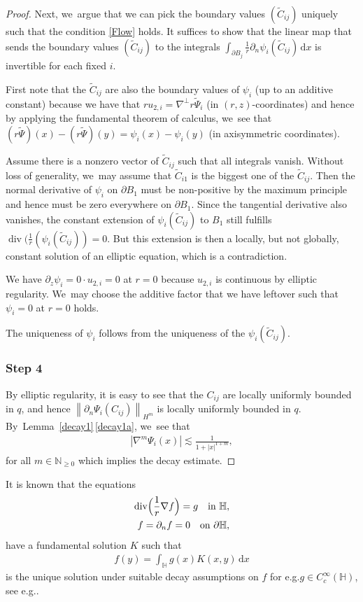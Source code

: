\documentclass[10pt]{amsart}
\newcommand{\eg}{e.g.}
\theoremstyle{definition}
\renewcommand{\div}{\operatorname{div}}
\newcommand\N{\mathbb{N}}
\newcommand\norm[1]{\left\lVert #1\right\rVert}
\newcommand\eq{=}
\newcommand\dd{\,\mathrm{d}}
\newcommand\dx{\dd x}
\let\de\partial
\begin{document}
\begin{proof}
Next, we~argue that we can pick the boundary values $(\tilde{C}_{ij})$ uniquely such that the condition \eqref{Flow} holds. It suffices to show that the linear map that sends the boundary values $(\tilde{C}_{ij})$ to the integrals $\int_{\de B_j}\frac{1}{r}\de_{n}\psi_i(\tilde{C}_{ij})\dx$ is invertible for each fixed $i$.

First note that the $\tilde{C}_{ij}$ are also the boundary values of $\psi_i$ (up to an additive constant) because we have that $ru_{2,i}=\nabla^\perp r\tilde{\Psi}_i$ (in $(r,z)$-coordinates) and hence by applying the fundamental theorem of calculus, we~see that $(r\tilde{\Psi})(x)-(r\tilde{\Psi})(y)=\psi_i(x)-\psi_i(y)$ (in axisymmetric coordinates).

Assume there is a nonzero vector of $\tilde{C}_{ij}$ such that all integrals vanish. Without loss of generality, we~may assume that $\tilde{C}_{i1}$ is the biggest one of the $\tilde{C}_{ij}$. Then the normal derivative of $\psi_i$ on $\de B_1$ must be non-positive by the maximum principle and hence must be zero everywhere on $\de B_1$. Since the tangential derivative also vanishes, the constant extension of $\psi_i(\tilde{C}_{ij})$ to $B_1$ still fulfills $\div(\frac{1}{r}(\psi_i(\tilde{C}_{ij}))=0$. But this extension is then a locally, but not globally, constant solution of an elliptic equation, which is a contradiction.

We have $\de_z\psi_i=0\cdot u_{2,i}=0$ at $r=0$ because $u_{2,i}$ is continuous by elliptic regularity. We~may choose the additive factor that we have leftover such that $\psi_i=0$ at $r=0$ holds.

The uniqueness of $\psi_i$ follows from the uniqueness of the $\psi_i(\tilde{C}_{ij})$.

\subsubsection*{Step 4} By elliptic regularity, it is easy to see that the $C_{ij}$ are locally uniformly bounded in $q$, and hence $\norm{\de_n\Psi_i(C_{ij})}_{H^m}$ is locally uniformly bounded in $q$. By~Lem\-ma~\ref{decay1}\,\eqref{decay1a}, we~see that
\begin{align*}|\nabla^m\Psi_i(x)|\lesssim \frac{1}{1+|x|^{1+m}},
\end{align*}
for all $m\in \N_{\geq 0}$ which implies the decay estimate.
\end{proof}

It is known that the equations
\begin{align*}
\div\Bigl(\frac{1}{r}\nabla f\Bigr)\eq g\quad\text{in $\mathbb{H}$},\\
f\eq\de_nf\eq 0\quad\text{on $\de\mathbb{H}$},
\end{align*}
have a fundamental solution $K$ such that
\begin{align}\label{definition K}
f(y)\eq \int_{\mathbb{H}}g(x)K(x,y)\dx
\end{align}
is the unique solution under suitable decay assumptions on $f$ for \eg $g\in C_c^\infty(\mathbb{H})$, see \eg \cite[\S 2]{GallaySverak}.
\end{document}
